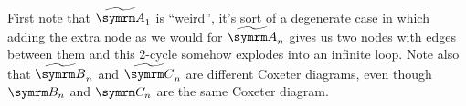 \endgroup
First note that \(\affA[1]\) is \enquote{weird}, it's sort of a degenerate case in which adding the extra node as we would for \(\affA[n]\) gives us two nodes with edges between them and this \(2\)-cycle somehow explodes into an infinite loop.
Note also that \(\affB[n]\) and \(\affC[n]\) are different Coxeter diagrams, even though \(\B[n]\) and \(\C[n]\) are the same Coxeter diagram.